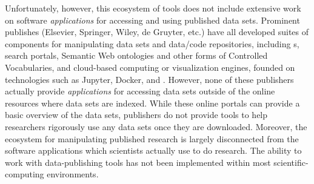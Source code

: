 \documentclass[11pt,letterpaper]{article}
\newcommand{\API}{\resizebox{!}{7pt}{\AcronymText{API}}}
\newcommand{\textscc}[1]{{\color{orr!35!black}{{%
						\fontfamily{Cabin-TLF}\fontseries{b}\selectfont{\textsc{\scriptsize{#1}}}}}}}
\newcommand{\AcronymText}[1]{{\textscc{#1}}}
\newcommand{\p}[1]{

\vspace{1em}#1}
\begin{document}
{\p{Unfortunately, however, this ecosystem 
of tools does not include extensive work 
on software \textit{applications} for 
accessing and using published data sets.  
Prominent publishes (Elsevier, Springer, Wiley, 
de Gruyter, etc.) have all developed 
suites of components for manipulating data 
sets and data/code repositories, including 
\API{}s, search portals, Semantic Web ontologies
and other forms of Controlled Vocabularies, and 
cloud-based computing or visualization engines, 
founded on technologies such as Jupyter, Docker, 
and \WebGL{}.  However, none of these 
publishers actually provide \textit{applications} 
for accessing data sets outside of the 
online resources where data sets are indexed.  
While these online portals can provide a 
basic overview of the data sets, publishers 
do not provide tools to help researchers 
rigorously use any data sets once they 
are downloaded.  Moreover, the ecosystem 
for manipulating published research is largely 
disconnected from the software  
applications which scientists actually 
use to do research.  The ability to work 
with data-publishing tools has not been 
implemented within most 
scientific-computing environments.}

}
\end{document}
